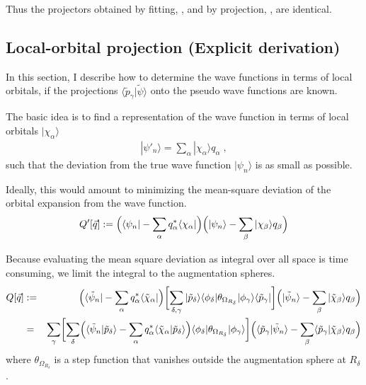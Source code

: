 \documentclass[11pt,a4paper]{report}
\begin{document}
Thus the projectors obtained by fitting,
, and by projection,
, are identical.

\subsection{Local-orbital projection (Explicit derivation)}
In this section, I describe how to determine the wave functions in
terms of local orbitals, if the projections
$\langle\tilde{p}_\gamma|\tilde{\psi}\rangle$ onto the pseudo wave
functions are known.

The basic idea is to find a representation of the wave function in
terms of local orbitals $|\chi_\alpha\rangle$
\begin{eqnarray}
|\psi'_n\rangle=\sum_\alpha |\chi_\alpha\rangle q_\alpha\;,
\end{eqnarray}
such that the deviation from the true wave function $|\psi_n\rangle$
is as small as possible.

Ideally, this would amount to minimizing the mean-square deviation of
the orbital expansion from the wave function.
\begin{eqnarray*}
Q'[\vec{q}]:=\Bigl(\langle\psi_n|-\sum_\alpha q^*_\alpha\langle\chi_\alpha|\Bigr)
\Bigl(|\psi_n\rangle-\sum_\beta |\chi_\beta\rangle q_\beta\Bigr)
\end{eqnarray*}

Because evaluating the mean square deviation as integral over all
space is time consuming, we limit the integral to the augmentation
spheres.
\begin{eqnarray}
Q[\vec{q}]&:=&
\Bigl(\langle\tilde{\psi}_n|
-\sum_\alpha q^*_\alpha\langle\tilde{\chi}_\alpha|\Bigr)
\biggl[\sum_{\delta,\gamma}|\tilde{p}_\delta\rangle\langle\phi_\delta|
\theta_{\Omega_{R_\delta}}|\phi_\gamma\rangle\langle\tilde{p}_\gamma|\biggr]
\Bigl(|\tilde{\psi}_n\rangle
-\sum_\beta |\tilde{\chi}_\beta\rangle q_\beta\Bigr)
\nonumber\\
&=&
\sum_{\gamma}
\biggl[
\sum_{\delta}
\Bigl(\langle\tilde{\psi}_n|\tilde{p}_\delta\rangle
-\sum_\alpha q^*_\alpha\langle\tilde{\chi}_\alpha|\tilde{p}_\delta\rangle\Bigr)
\langle\phi_\delta|\theta_{\Omega_{R_\delta}}|\phi_\gamma\rangle
\biggr]
\Bigl(\langle\tilde{p}_\gamma|\tilde{\psi}_n\rangle
-\sum_\beta \langle\tilde{p}_\gamma|\tilde{\chi}_\beta\rangle q_\beta\Bigr)
\end{eqnarray}
where $\theta_{\Omega_{R_\delta}}$ is a step function that vanishes
outside the augmentation sphere at $R_\delta$.
\end{document}
